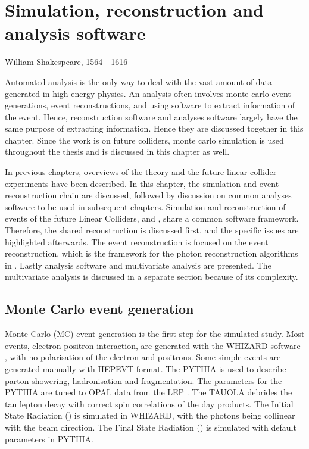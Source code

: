 \chapter{Simulation, reconstruction and analysis software}
\label{chap:Reconstruction}

%
{William Shakespeare, 1564 - 1616}%


Automated analysis is the only way to deal with the vast amount of data generated in high energy physics. An analysis often involves monte carlo event generations, event reconstructions, and using software to extract information of the event. Hence, reconstruction software and analyses software largely have the same purpose of extracting information. Hence they are discussed together in this chapter. Since the work is on future colliders,  monte carlo simulation is used throughout the thesis and is discussed in this chapter as well.

In previous chapters, overviews of the theory and the future linear collider experiments have been described. In this chapter, the simulation and event reconstruction chain are discussed, followed by  discussion on  common analyses software to be used in subsequent chapters. Simulation and reconstruction of events of the future Linear Colliders, \ILC and \CLIC, share a  common software framework.  Therefore,  the shared reconstruction is discussed first, and the \CLIC specific issues are highlighted afterwards. The event reconstruction is focused on the \pandora event reconstruction, which is the framework for the photon reconstruction algorithms in . Lastly analysis software and multivariate analysis are presented.   The multivariate analysis  is discussed in a separate section because of its complexity.

\section{Monte Carlo event generation}
\label{sec:pandoraMC}
Monte Carlo (MC) event generation is the first step for the simulated study. Most events, electron-positron interaction, are generated with the WHIZARD software \cite{whizard,Moretti:2001zz}, with no polarisation of the electron and positrons. Some simple events are generated manually with HEPEVT format. The PYTHIA \cite{Sjostrand:1995iq} is used to describe parton showering, hadronisation and fragmentation. The parameters for the PYTHIA are tuned to OPAL data from the LEP \cite{Alexander:1995bk}. The TAUOLA \cite{Jadach:1993hs} debrides the tau lepton decay with correct spin correlations of the day products. The Initial State Radiation (\ISR) is simulated in WHIZARD, with the \ISR photons being collinear with the beam direction. The Final State Radiation (\FSR) is simulated with default parameters in PYTHIA.

